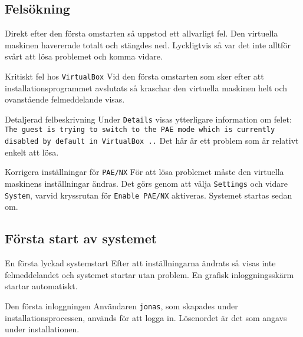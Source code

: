 \subsection{Felsökning}
Direkt efter den första omstarten så uppstod ett allvarligt fel. Den virtuella
maskinen havererade totalt och stängdes ned. Lyckligtvis så var det inte alltför
svårt att lösa problemet och komma vidare.

           {Kritiskt fel hos \texttt{VirtualBox}}
           {Vid den första omstarten som sker efter att installationsprogrammet
            avslutats så kraschar den virtuella maskinen helt och ovanstående
            felmeddelande visas.}
           {}

           {Detaljerad felbeskrivning}
           {Under \texttt{Details} visas ytterligare information om felet:
             \texttt{The guest is trying to switch to the PAE mode which is
            currently disabled by default in VirtualBox ..}
            Det här är ett problem som är relativt enkelt att lösa.}
           {}

           {Korrigera inställningar för \texttt{PAE/NX}}
           {För att lösa problemet måste den virtuella maskinens inställningar
            ändras. Det görs genom att välja \texttt{Settings} och vidare
            \texttt{System}, varvid kryssrutan för \texttt{Enable PAE/NX}
            aktiveras.  Systemet startas sedan om.}
           {}


\subsection{Första start av systemet}

           {En första lyckad systemstart}
           {Efter att inställningarna ändrats så visas inte felmeddelandet och
            systemet startar utan problem. En grafisk inloggningsskärm startar
            automatiskt.}
           {}

           {Den första inloggningen}
           {Användaren \texttt{jonas}, som skapades under
            installationsprocessen, används för att logga in.  Lösenordet är
            det som angavs under installationen.}
           {}

